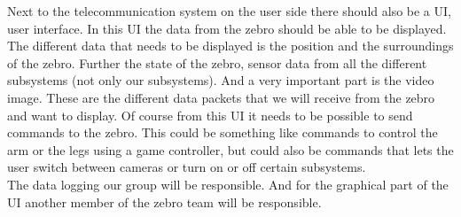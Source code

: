 \documentclass{article}
\begin{document}
Next to the telecommunication system on the user side there should also be a UI, user interface. In this UI the data from the zebro should be able to be displayed. The different data that needs to be displayed is the position and the surroundings of the zebro. Further the state of the zebro, sensor data from all the different subsystems (not only our subsystems). And a very important part is the video image. These are the different data packets that we will receive from the zebro and want to display. Of course from this UI it needs to be possible to send commands to the zebro. This could be something like commands to control the arm or the legs using a game controller, but could also be commands that lets the user switch between cameras or turn on or off certain subsystems.\\
The data logging our group will be responsible. And for the graphical part of the UI another member of the zebro team will be responsible. 
\end{document}
